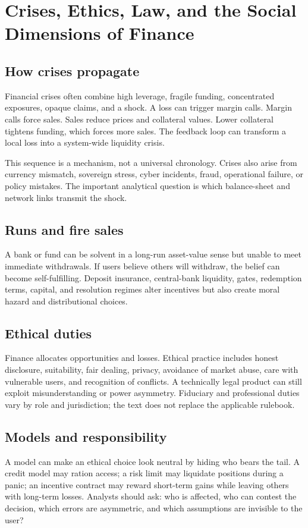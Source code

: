 \chapter{Crises, Ethics, Law, and the Social Dimensions of Finance}

\section{How crises propagate}
Financial crises often combine high leverage, fragile funding, concentrated exposures, opaque claims, and a shock. A loss can trigger margin calls. Margin calls force sales. Sales reduce prices and collateral values. Lower collateral tightens funding, which forces more sales. The feedback loop can transform a local loss into a system-wide liquidity crisis.

This sequence is a mechanism, not a universal chronology. Crises also arise from currency mismatch, sovereign stress, cyber incidents, fraud, operational failure, or policy mistakes. The important analytical question is which balance-sheet and network links transmit the shock.

\section{Runs and fire sales}
A bank or fund can be solvent in a long-run asset-value sense but unable to meet immediate withdrawals. If users believe others will withdraw, the belief can become self-fulfilling. Deposit insurance, central-bank liquidity, gates, redemption terms, capital, and resolution regimes alter incentives but also create moral hazard and distributional choices.

\section{Ethical duties}
Finance allocates opportunities and losses. Ethical practice includes honest disclosure, suitability, fair dealing, privacy, avoidance of market abuse, care with vulnerable users, and recognition of conflicts. A technically legal product can still exploit misunderstanding or power asymmetry. Fiduciary and professional duties vary by role and jurisdiction; the text does not replace the applicable rulebook.

\section{Models and responsibility}
A model can make an ethical choice look neutral by hiding who bears the tail. A credit model may ration access; a risk limit may liquidate positions during a panic; an incentive contract may reward short-term gains while leaving others with long-term losses. Analysts should ask: who is affected, who can contest the decision, which errors are asymmetric, and which assumptions are invisible to the user?

